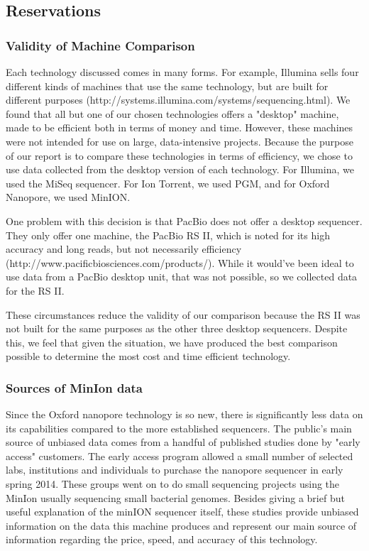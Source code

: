 \documentclass[12pt,letterpaper]{report}
\begin{document}
\subsection{Reservations}

\subsubsection{Validity of Machine Comparison}

Each technology discussed comes in many forms. For example, Illumina sells four different kinds of machines that use the same technology, but are built for different purposes (http://systems.illumina.com/systems/sequencing.html). We found that all but one of our chosen technologies offers a "desktop" machine, made to be efficient both in terms of money and time. However, these machines were not intended for use on large, data-intensive projects. Because the purpose of our report is to compare these technologies in terms of efficiency, we chose to use data collected from the desktop version of each technology. For Illumina, we used the MiSeq sequencer. For Ion Torrent, we used PGM, and for Oxford Nanopore, we used MinION.

One problem with this decision is that PacBio does not offer a desktop sequencer. They only offer one machine, the PacBio RS II, which is noted for its high accuracy and long reads, but not necessarily efficiency (http://www.pacificbiosciences.com/products/). While it would've been ideal to use data from a PacBio desktop unit, that was not possible, so we collected data for the RS II.

These circumstances reduce the validity of our comparison because the RS II was not built for the same purposes as the other three desktop sequencers. Despite this, we feel that given the situation, we have produced the best comparison possible to determine the most cost and time efficient technology.  

\subsubsection{Sources of MinIon data}

Since the Oxford nanopore technology is so new, there is significantly less data on its capabilities compared to the more established sequencers. The public's main source of unbiased data comes from a handful of published studies done by "early access" customers. The early access program allowed a small number of selected labs, institutions and individuals to purchase the nanopore sequencer in early spring 2014. These groups went on to do small sequencing projects using the MinIon usually sequencing small bacterial genomes. Besides giving a brief but useful explanation of the minION sequencer itself, these studies provide unbiased information on the data this machine produces and represent our main source of information regarding the price, speed, and accuracy of this technology.
\end{document}
